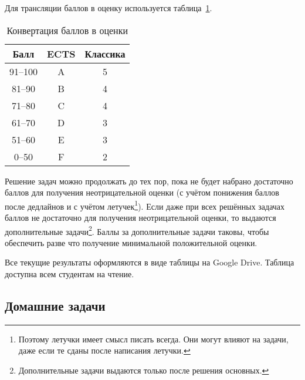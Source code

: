 Для трансляции баллов в оценку используется таблица~\ref{tbl:ects}.

\begin{table}[h]
    \caption{Конвертация баллов в оценки}
    \label{tbl:ects}
\begin{center}
    \begin{tabular}{ | c | c | c |}
        \hline
        Балл & ECTS & Классика \\
        \hline
        \hline
        91--100 & A & 5 \\
        81--90  & B & 4 \\
        71--80  & C & 4 \\
        61--70  & D & 3 \\
        51--60  & E & 3 \\
         0--50  & F & 2 \\
        \hline
    \end{tabular}
\end{center}
\end{table}

Решение задач можно продолжать до тех пор, пока не будет набрано достаточно баллов для получения неотрицательной оценки (с учётом понижения баллов после дедлайнов и с учётом летучек\footnote{Поэтому летучки имеет смысл писать всегда. Они могут влияют на задачи, даже если те сданы после написания летучки.}).
Если даже при всех решённых задачах баллов не достаточно для получения неотрицательной оценки, то выдаются дополнительные задачи\footnote{Дополнительные задачи выдаются только после решения основных.}.
Баллы за дополнительные задачи таковы, чтобы обеспечить разве что получение минимальной положительной оценки.

Все текущие результаты оформляются в виде таблицы на Google Drive.
Таблица доступна всем студентам на чтение.

\subsection{Домашние задачи}

